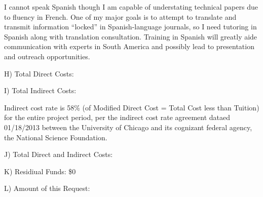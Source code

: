 \documentclass[11pt,letterpaper]{article}
\begin{document}
I cannot speak Spanish though I am capable of understating technical papers due to fluency in French. One of my major goals is to attempt to translate and transmit information ``locked'' in Spanish-language journals, so I need tutoring in Spanish along with translation consultation. Training in Spanish will greatly aide communication with experts in South America and possibly lead to presentation and outreach opportunities.


H) Total Direct Costs:

I) Total Indirect Costs:

Indirect cost rate is 58\% (of Modified Direct Cost = Total Cost less than Tuition) for the entire project period, per the indirect cost rate agreement dataed 01/18/2013 between the University of Chicago and its cognizant federal agency, the National Science Foundation.


J) Total Direct and Indirect Costs:

K) Residiual Funds: \$0

L) Amount of this Request:
\end{document}
